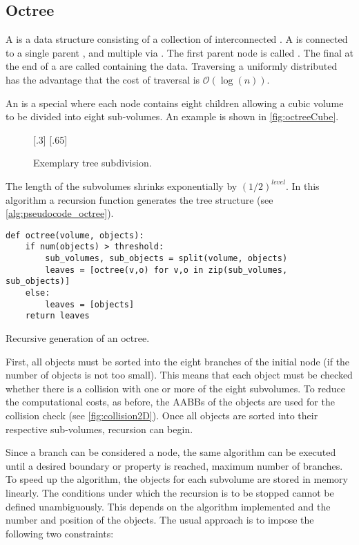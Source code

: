 \subsection{Octree}\label{sec:octree}
%
A  is a data structure consisting of a collection of interconnected  .
A  is connected to a single parent , and multiple  via .
The first parent node is called .
The final  at the end of a  are called  containing the data.
Traversing a uniformly distributed  has the advantage that the cost of traversal is $\mathcal{O}(\log(n))$.
\par
%
An  is a special  where each node contains eight children allowing a cubic volume to be divided into eight sub-volumes.
An example is shown in \cref{fig:octreeCube}.
% 
\begin{figure}[!t]
    \centering
    [.3\textwidth]{
    \def\tikzheight{0.6\textwidth}
    }
    \hfill
    [.65\textwidth]{
    \def\tikzheight{0.6\textwidth}
    }
	\caption[]{Exemplary tree subdivision.}
	\label{fig:octree}
\end{figure}
% 
The length of the subvolumes shrinks exponentially by $(1/2)^\mathit{level}$.
In this algorithm a recursion function  generates the tree structure (see \cref{alg:pseudocode_octree}).
\par
%
\begin{lstfloat}[!tb]
\lstset{style=python}
\begin{lstlisting}[]
def octree(volume, objects):
    if num(objects) > threshold:
        sub_volumes, sub_objects = split(volume, objects)
        leaves = [octree(v,o) for v,o in zip(sub_volumes, sub_objects)]
    else:
        leaves = [objects]
    return leaves
\end{lstlisting}
\caption[]{Recursive generation of an octree.}
\label{alg:pseudocode_octree}
\end{lstfloat}
%
First, all objects must be sorted into the eight branches of the initial node (if the number of objects is not too small). This means that each object must be checked whether there is a collision with one or more of the eight subvolumes.
To reduce the computational costs, as before, the \acp{AABB} of the objects are used for the collision check (see \cref{fig:collision2D}).
Once all objects are sorted into their respective sub-volumes, recursion can begin.
\par
% 
Since a branch can be considered a node, the same algorithm can be executed until a desired boundary or property is reached, \eg{} maximum number of branches.
To speed up the algorithm, the objects for each subvolume are stored in memory linearly.
The conditions under which the recursion is to be stopped cannot be defined unambiguously.
This depends on the algorithm implemented and the number and position of the objects.
The usual approach is to impose the following two constraints:
%
